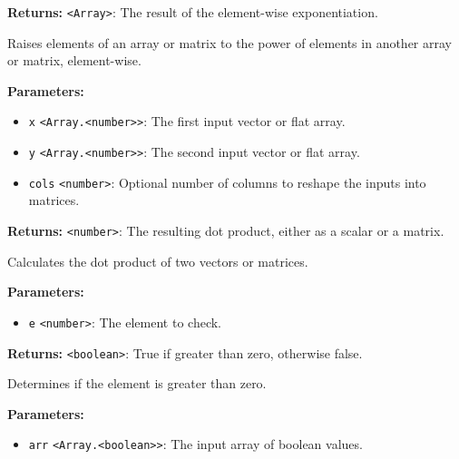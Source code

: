 \documentclass[12pt,a4paper]{article}
\begin{document}
\noindent \textbf{Returns:} \texttt{<Array>}: The result of the element-wise exponentiation.

\noindent Raises elements of an array or matrix to the power of elements in another array or matrix, element-wise.

\vspace{5mm}
\noindent {}


\noindent \textbf{Parameters:}
\begin{itemize}
  \item \texttt{x} \texttt{<Array.<number>>}: The first input vector or flat array.
  \item \texttt{y} \texttt{<Array.<number>>}: The second input vector or flat array.
  \item \texttt{cols} \texttt{<number>}: Optional number of columns to reshape the inputs into matrices.
\end{itemize}

\noindent \textbf{Returns:} \texttt{<number>}: The resulting dot product, either as a scalar or a matrix.

\noindent Calculates the dot product of two vectors or matrices.

\vspace{5mm}
\noindent {}


\noindent \textbf{Parameters:}
\begin{itemize}
  \item \texttt{e} \texttt{<number>}: The element to check.
\end{itemize}

\noindent \textbf{Returns:} \texttt{<boolean>}: True if greater than zero, otherwise false.

\noindent Determines if the element is greater than zero.

\vspace{5mm}
\noindent {}


\noindent \textbf{Parameters:}
\begin{itemize}
  \item \texttt{arr} \texttt{<Array.<boolean>>}: The input array of boolean values.
\end{itemize}
\end{document}
